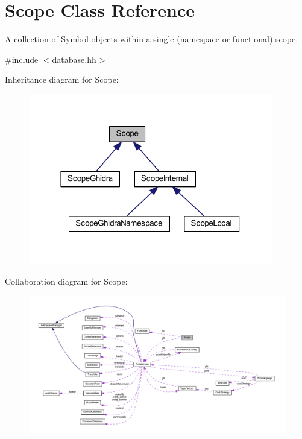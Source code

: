 \hypertarget{class_scope}{}\section{Scope Class Reference}
\label{class_scope}


A collection of \mbox{\hyperlink{class_symbol}{Symbol}} objects within a single (namespace or functional) scope.  




{\ttfamily \#include $<$database.\+hh$>$}



Inheritance diagram for Scope\+:
\nopagebreak
\begin{figure}[H]
\begin{center}
\leavevmode
\includegraphics[width=302pt]{class_scope__inherit__graph}
\end{center}
\end{figure}


Collaboration diagram for Scope\+:
\nopagebreak
\begin{figure}[H]
\begin{center}
\leavevmode
\includegraphics[width=350pt]{class_scope__coll__graph}
\end{center}
\end{figure}
